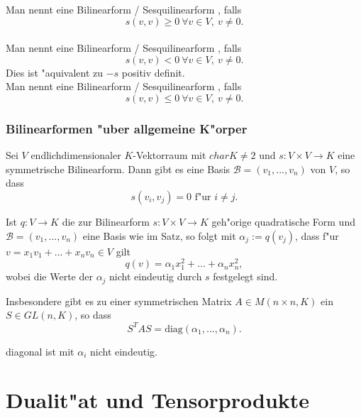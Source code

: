 \documentclass[8pt, a4paper, twocolumn, landscape]{article}
\newcommand{\comment}[1]{}
\begin{document}
\begin{definition}
Man nennt eine Bilinearform / Sesquilinearform , falls 
$$
s(v,v) \geq 0 \ \forall v \in V, \ v \neq 0.
$$
\\
Man nennt eine Bilinearform / Sesquilinearform , falls 
$$
s(v,v) < 0 \ \forall  v \in V, \ v \neq 0.
$$
Dies ist "aquivalent zu $-s$ positiv definit.
\\
Man nennt eine Bilinearform / Sesquilinearform , falls 
$$
s(v,v) \leq 0 \  \forall v \in V, \ v \neq 0.
$$
\end{definition}

\subsubsection{Bilinearformen "uber allgemeine K"orper}
\begin{theorem} 
Sei $V$ endlichdimensionaler $K$-Vektorraum mit $char K \neq 2$ und $s : V \times V \rightarrow K$ eine symmetrische Bilinearform. Dann gibt es eine Basis $\mathcal{B} = (v_1, ..., v_n)$ von $V$, so dass
$$
s(v_i, v_j) = 0 \text{ f"ur } i \neq j.
$$
\end{theorem}

\begin{corollary}
Ist $q : V \rightarrow K$ die zur Bilinearform $s : V \times V \rightarrow K$ geh"orige quadratische Form und $\mathcal{B} = (v_1, ... , v_n)$ eine Basis wie im Satz, so folgt mit $\alpha_j := q(v_j)$, dass f"ur $v = x_1 v_1 + ... + x_n v_n \in V$ gilt 
$$
q(v) = \alpha_1 x_1^2 + ... + \alpha_n x_n^2,
$$
wobei die Werte der $\alpha_j$ nicht eindeutig durch $s$ festgelegt sind.

Insbesondere gibt es zu einer symmetrischen Matrix $A \in M(n \times n, K)$ ein $S \in GL(n, K)$, so dass 
$$
S^T A S = \mathrm{diag}(\alpha_1, ..., \alpha_n).
$$
\comment{\left(\begin{array}{ccc}\alpha_{1} & & 0 
\\ & \ddots & 
\\ 0 & & \alpha_{n}\end{array}\right) = D
}
diagonal ist mit $\alpha_i$ nicht eindeutig.
\end{corollary}







\section{Dualit"at und Tensorprodukte}
\end{document}
